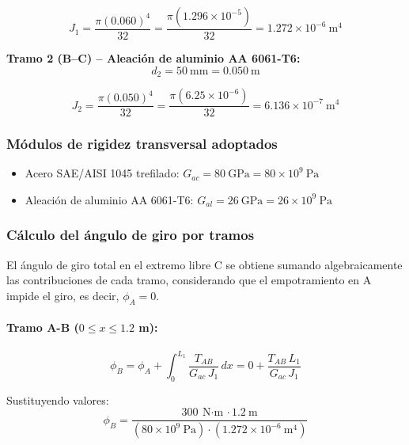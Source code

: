 \documentclass[12pt,a4paper]{article}
\begin{document}
\begin{enumerate}
\begin{equation}
J_1 = \frac{\pi (0.060)^4}{32}
= \frac{\pi (1.296 \times 10^{-5})}{32}
= 1.272 \times 10^{-6}\ \text{m}^4
\end{equation}

\textbf{Tramo 2 (B--C) -- Aleación de aluminio AA 6061-T6:}
\begin{equation}
d_2 = 50\ \text{mm} = 0.050\ \text{m}
\end{equation}

\begin{equation}
J_2 = \frac{\pi (0.050)^4}{32}
= \frac{\pi (6.25 \times 10^{-6})}{32}
= 6.136 \times 10^{-7}\ \text{m}^4
\end{equation}

\subsubsection*{Módulos de rigidez transversal adoptados}

\begin{itemize}
    \item Acero SAE/AISI 1045 trefilado: $G_{ac} = 80\ \text{GPa} = 80 \times 10^9\ \text{Pa}$
    \item Aleación de aluminio AA 6061-T6: $G_{al} = 26\ \text{GPa} = 26 \times 10^9\ \text{Pa}$
\end{itemize}

\subsubsection*{Cálculo del ángulo de giro por tramos}

El ángulo de giro total en el extremo libre C se obtiene sumando algebraicamente las contribuciones de cada tramo, considerando que el empotramiento en A impide el giro, es decir, $\phi_A = 0$.

\paragraph{Tramo A-B ($0 \leq x \leq 1.2$ m):}
\begin{equation}
\phi_B=\phi_A+\int_0^{L_1}\frac{T_{AB}}{G_{ac}\,J_1}\,dx
=0+\frac{T_{AB}\,L_1}{G_{ac}\,J_1}
\end{equation}

Sustituyendo valores:
\begin{equation}
\phi_B=\frac{300\ \text{N$\cdot$m}\cdot 1.2\ \text{m}}
{(80\times 10^9\ \text{Pa})\cdot (1.272\times 10^{-6}\ \text{m}^4)}
\end{equation}


\end{enumerate}
\end{document}
